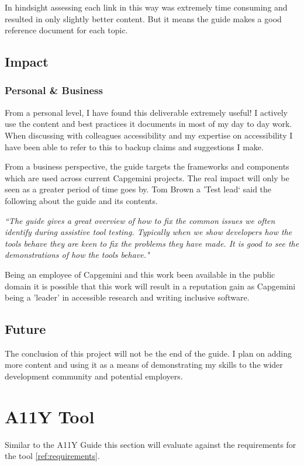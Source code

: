 In hindsight assessing each link in this way was extremely time consuming and
resulted in only slightly better content. But it means the guide makes a good
reference document for each topic.

\subsection{Impact}
\subsubsection{Personal \& Business}
From a personal level, I have found this deliverable extremely useful! I
actively use the content and best practices it documents in most of my day to
day work. When discussing with colleagues accessibility and my expertise on
accessibility I have been able to refer to this to backup claims and
suggestions I make.

From a business perspective, the guide targets the frameworks and components
which are used across current Capgemini projects. The real impact will
only be seen as a greater period of time goes by. Tom Brown a 'Test lead` said
the following about the guide and its contents.

\begin{center}
\textit{``The guide gives a great overview of how to fix the common issues we
often identify during assistive tool testing. Typically when we show developers
how the tools behave they are keen to fix the problems they have made. It is
good to see the demonstrations of how the tools behave."}
\end{center}

Being an employee of Capgemini and this work been available in the public
domain it is possible that this work will result in a reputation gain as
Capgemini being a 'leader' in accessible research and writing inclusive
software.

\subsection{Future}
The conclusion of this project will not be the end of the guide. I plan on
adding more content and using it as a means of demonstrating my skills to the
wider development community and potential employers.

\section{A11Y Tool}
Similar to the A11Y Guide this section will evaluate against the requirements
for the tool \ref{ref:requirements}.


